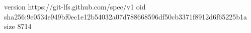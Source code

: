 version https://git-lfs.github.com/spec/v1
oid sha256:9e0534e949bf0ec1e12b54032a07d788668596df50cb3371f8912d6f65225b1a
size 8714
